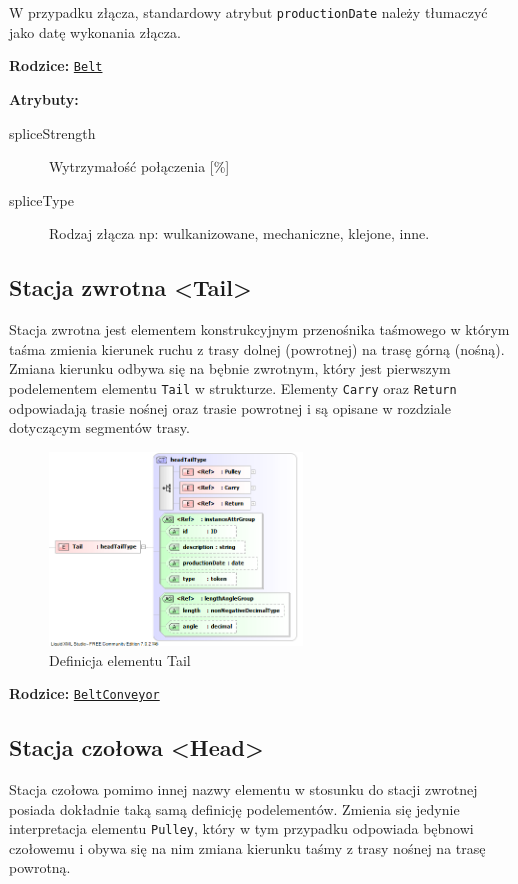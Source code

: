 \documentclass[12pt,a4paper]{article}
\begin{document}
W przypadku złącza, standardowy atrybut {\tt productionDate} należy tłumaczyć
jako datę wykonania złącza.

\noindent\textbf{Rodzice:} \texttt{\hyperref[sec:Belt]{Belt}}

\noindent\textbf{Atrybuty:}
\begin{description}
\item[spliceStrength] Wytrzymałość połączenia [\%]
\item[spliceType] Rodzaj złącza np: wulkanizowane, mechaniczne, klejone, inne.
\end{description}


\subsection{Stacja zwrotna <Tail>}
Stacja zwrotna jest elementem konstrukcyjnym przenośnika taśmowego w którym
taśma zmienia kierunek ruchu z trasy dolnej (powrotnej) na trasę górną (nośną).
Zmiana kierunku odbywa się na bębnie zwrotnym, który jest pierwszym podelementem
elementu {\tt Tail} w strukturze.  Elementy {\tt Carry} oraz {\tt Return}
odpowiadają trasie nośnej oraz trasie powrotnej i są opisane w rozdziale
dotyczącym segmentów trasy.

\begin{figure}[H]
  \centering
  \includegraphics[width=0.6\textwidth]{png/liquid/Tail}
  \caption{Definicja elementu Tail}
  \label{fig:tail-xsd}
\end{figure}

\noindent\textbf{Rodzice:} \texttt{\hyperref[sec:BeltConveyor]{BeltConveyor}}


\subsection{Stacja czołowa <Head>}
Stacja czołowa pomimo innej nazwy elementu w stosunku do stacji zwrotnej posiada
dokładnie taką samą definicję podelementów.  Zmienia się jedynie interpretacja
elementu {\tt Pulley}, który w tym przypadku odpowiada bębnowi czołowemu i obywa
się na nim zmiana kierunku taśmy z trasy nośnej na trasę powrotną.
\end{document}
